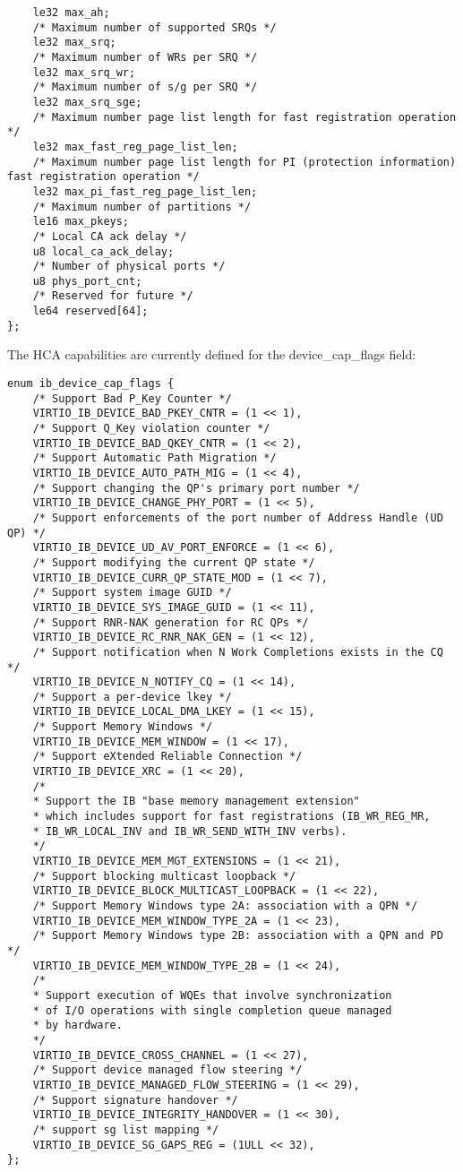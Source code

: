 \begin{lstlisting}
    le32 max_ah;
    /* Maximum number of supported SRQs */
    le32 max_srq;
    /* Maximum number of WRs per SRQ */
    le32 max_srq_wr;
    /* Maximum number of s/g per SRQ */
    le32 max_srq_sge;
    /* Maximum number page list length for fast registration operation */
    le32 max_fast_reg_page_list_len;
    /* Maximum number page list length for PI (protection information) fast registration operation */
    le32 max_pi_fast_reg_page_list_len;
    /* Maximum number of partitions */
    le16 max_pkeys;
    /* Local CA ack delay */
    u8 local_ca_ack_delay;
    /* Number of physical ports */
    u8 phys_port_cnt;
    /* Reserved for future */
    le64 reserved[64];
};
\end{lstlisting}

The HCA capabilities are currently defined for the device_cap_flags field:

\begin{lstlisting}
enum ib_device_cap_flags {
    /* Support Bad P_Key Counter */
    VIRTIO_IB_DEVICE_BAD_PKEY_CNTR = (1 << 1),
    /* Support Q_Key violation counter */
    VIRTIO_IB_DEVICE_BAD_QKEY_CNTR = (1 << 2),
    /* Support Automatic Path Migration */
    VIRTIO_IB_DEVICE_AUTO_PATH_MIG = (1 << 4),
    /* Support changing the QP's primary port number */
    VIRTIO_IB_DEVICE_CHANGE_PHY_PORT = (1 << 5),
    /* Support enforcements of the port number of Address Handle (UD QP) */
    VIRTIO_IB_DEVICE_UD_AV_PORT_ENFORCE = (1 << 6),
    /* Support modifying the current QP state */
    VIRTIO_IB_DEVICE_CURR_QP_STATE_MOD = (1 << 7),
    /* Support system image GUID */
    VIRTIO_IB_DEVICE_SYS_IMAGE_GUID = (1 << 11),
    /* Support RNR-NAK generation for RC QPs */
    VIRTIO_IB_DEVICE_RC_RNR_NAK_GEN = (1 << 12),
    /* Support notification when N Work Completions exists in the CQ */
    VIRTIO_IB_DEVICE_N_NOTIFY_CQ = (1 << 14),
    /* Support a per-device lkey */
    VIRTIO_IB_DEVICE_LOCAL_DMA_LKEY = (1 << 15),
    /* Support Memory Windows */
    VIRTIO_IB_DEVICE_MEM_WINDOW = (1 << 17),
    /* Support eXtended Reliable Connection */
    VIRTIO_IB_DEVICE_XRC = (1 << 20),
    /*
    * Support the IB "base memory management extension"
    * which includes support for fast registrations (IB_WR_REG_MR,
    * IB_WR_LOCAL_INV and IB_WR_SEND_WITH_INV verbs).
    */
    VIRTIO_IB_DEVICE_MEM_MGT_EXTENSIONS = (1 << 21),
    /* Support blocking multicast loopback */
    VIRTIO_IB_DEVICE_BLOCK_MULTICAST_LOOPBACK = (1 << 22),
    /* Support Memory Windows type 2A: association with a QPN */
    VIRTIO_IB_DEVICE_MEM_WINDOW_TYPE_2A = (1 << 23),
    /* Support Memory Windows type 2B: association with a QPN and PD */
    VIRTIO_IB_DEVICE_MEM_WINDOW_TYPE_2B = (1 << 24),
    /*
    * Support execution of WQEs that involve synchronization
    * of I/O operations with single completion queue managed
    * by hardware.
    */
    VIRTIO_IB_DEVICE_CROSS_CHANNEL = (1 << 27),
    /* Support device managed flow steering */
    VIRTIO_IB_DEVICE_MANAGED_FLOW_STEERING = (1 << 29),
    /* Support signature handover */
    VIRTIO_IB_DEVICE_INTEGRITY_HANDOVER = (1 << 30),
    /* support sg list mapping */
    VIRTIO_IB_DEVICE_SG_GAPS_REG = (1ULL << 32),
};
\end{lstlisting}

